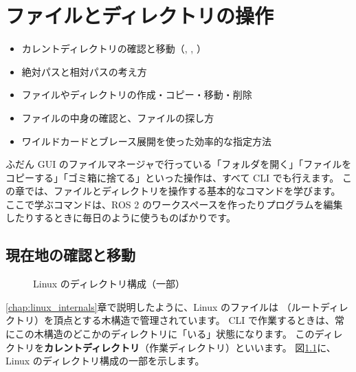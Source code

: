 \chapter{ファイルとディレクトリの操作}
\label{chap:files}

\begin{goalbox}
  \begin{itemize}
    \item カレントディレクトリの確認と移動（, , ）
    \item 絶対パスと相対パスの考え方
    \item ファイルやディレクトリの作成・コピー・移動・削除
    \item ファイルの中身の確認と、ファイルの探し方
    \item ワイルドカードとブレース展開を使った効率的な指定方法
  \end{itemize}
\end{goalbox}

ふだん GUI のファイルマネージャで行っている「フォルダを開く」「ファイルをコピーする」「ゴミ箱に捨てる」といった操作は、すべて CLI でも行えます。
この章では、ファイルとディレクトリを操作する基本的なコマンドを学びます。
ここで学ぶコマンドは、ROS 2 のワークスペースを作ったりプログラムを編集したりするときに毎日のように使うものばかりです。

\section{現在地の確認と移動}
\label{sec:files-navigation}

\begin{figure}[tb]
  \centering
  \large
  \caption{Linux のディレクトリ構成（一部）}
  \label{fig:files-tree}
\end{figure}

\ref{chap:linux_internals}章で説明したように、Linux のファイルは \cmd{/}（ルートディレクトリ）を頂点とする木構造で管理されています。
CLI で作業するときは、常にこの木構造のどこかのディレクトリに「いる」状態になります。
このディレクトリを\textbf{カレントディレクトリ}（作業ディレクトリ）といいます。
図\ref{fig:files-tree}に、Linux のディレクトリ構成の一部を示します。

